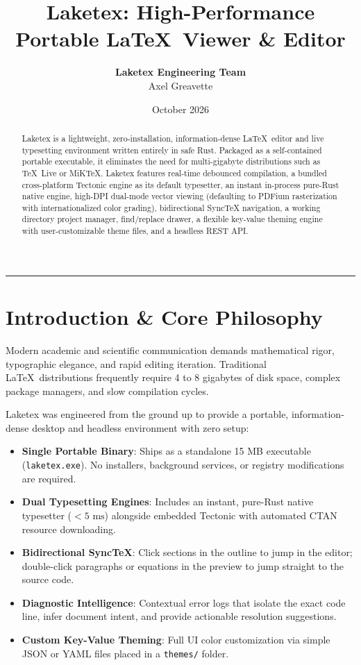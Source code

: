 \documentclass[11pt, a4paper]{article}
\title{\textbf{Laketex: High-Performance Portable \LaTeX\ Viewer \& Editor}}
\author{\textbf{Laketex Engineering Team} \\ Axel Greavette}
\date{October 2026}
\begin{document}
\maketitle

\begin{abstract}
Laketex is a lightweight, zero-installation, information-dense \LaTeX\ editor and live typesetting environment written entirely in safe Rust. Packaged as a self-contained portable executable, it eliminates the need for multi-gigabyte distributions such as \TeX\ Live or MiK\TeX. Laketex features real-time debounced compilation, a bundled cross-platform Tectonic engine as its default typesetter, an instant in-process pure-Rust native engine, high-DPI dual-mode vector viewing (defaulting to PDFium rasterization with internationalized color grading), bidirectional SyncTeX navigation, a working directory project manager, find/replace drawer, a flexible key-value theming engine with user-customizable theme files, and a headless REST API.
\end{abstract}

\tableofcontents

\vspace{1em}
\hrule
\vspace{1em}

\section{Introduction \& Core Philosophy}

Modern academic and scientific communication demands mathematical rigor, typographic elegance, and rapid editing iteration. Traditional \LaTeX\ distributions frequently require 4 to 8 gigabytes of disk space, complex package managers, and slow compilation cycles. 

Laketex was engineered from the ground up to provide a portable, information-dense desktop and headless environment with zero setup:
\begin{itemize}
    \item \textbf{Single Portable Binary}: Ships as a standalone 15 MB executable (\texttt{laketex.exe}). No installers, background services, or registry modifications are required.
    \item \textbf{Dual Typesetting Engines}: Includes an instant, pure-Rust native typesetter ($< 5\text{ ms}$) alongside embedded Tectonic with automated CTAN resource downloading.
    \item \textbf{Bidirectional SyncTeX}: Click sections in the outline to jump in the editor; double-click paragraphs or equations in the preview to jump straight to the source code.
    \item \textbf{Diagnostic Intelligence}: Contextual error logs that isolate the exact code line, infer document intent, and provide actionable resolution suggestions.
    \item \textbf{Custom Key-Value Theming}: Full UI color customization via simple JSON or YAML files placed in a \texttt{themes/} folder.
\end{itemize}
\end{document}
